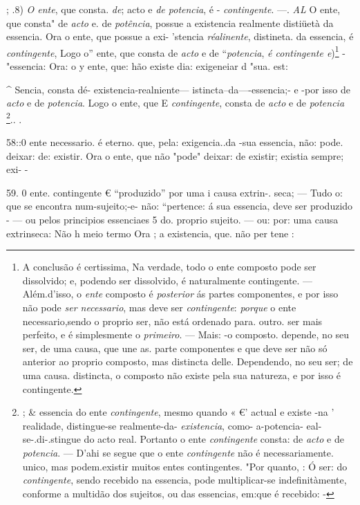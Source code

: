 ; .8) \emph{O ente}, que consta. \emph{de}; acto e \emph{de potencia}, é - \emph{contingente}. ---. \emph{AL} O ente, que consta" de \emph{acto} e. de \emph{potência}, possue a existencia realmente distiüetà da essencia. Ora o ente, que possue a exi- 'stencia \emph{réalinente}, distineta. da essencia, é \emph{contingente}, Logo o” ente, que consta de \emph{acto} e de “\emph{potencia}, \emph{é contingente e})\footnote{A conclusão é certissima, Na verdade, todo o ente composto pode ser dissolvido; e, podendo ser dissolvido, é naturalmente contingente. --- Além.d'isso, o \emph{ente} composto é \emph{posterior} ás partes componentes, e por isso não pode \emph{ser necessario}, mas deve ser \emph{contingente}: \emph{porque} o ente necessario,sendo o proprio ser, não está ordenado para. outro. ser mais perfeito, e é simplesmente o \emph{primeiro}. --- Mais: -o composto. depende, no seu ser, de uma causa, que une as. parte componentes e que deve ser não só anterior ao proprio composto, mas distincta delle. Dependendo, no seu ser; de uma causa. distincta, o composto não existe pela sua natureza, e por isso é contingente.}   -"essencia: Ora: o y ente, que: hão existe dia: exigeneiar d "sua. est:

\textasciicircum{} Sencia, consta dé- existencia-realniente--- istincta--da----essencia;- e -por isso de \emph{acto} e de \emph{potencia}. Logo o ente, que E \emph{contingente}, \textbar{} consta de \emph{acto} e de \emph{potencia} \footnote{; \& essencia do ente \emph{contingente}, mesmo quando « €' actual e existe -na ' realidade, distingue-se realmente-da- \emph{existencia}, como- a-potencia- eal-se-.di-.stingue do acto real. Portanto o ente \emph{contingente} consta: de \emph{acto} e de \emph{potencia}. --- D'ahi se segue que o ente \emph{contingente} não é necessariamente. unico, mas podem.existir muitos entes contingentes. "Por quanto, : Ó ser: do \emph{contingente}, sendo recebido na essencia, pode multiplicar-se indefinitàmente, conforme a multidão dos sujeitos, ou das essencias, em:que é recebido: \textbar{} -}.. .

58::0 ente necessario. é eterno. \textbar{}que, pela: exigencia..da -sua essencia, não: pode. deixar: de: existir. Ora o ente, que não "pode" deixar: de existir; existia sempre; exi- -

59. 0 ente. contingente € “produzido” por uma i causa extrin-. seca; --- Tudo o: que se encontra num-sujeito;-e- não: “pertence: á sua essencia, deve ser produzido - --- ou pelos principios essenciaes 5 do. proprio sujeito. --- ou: por: uma causa extrinseca: Não h meio termo Ora ; a existencia, que. não per tene :

